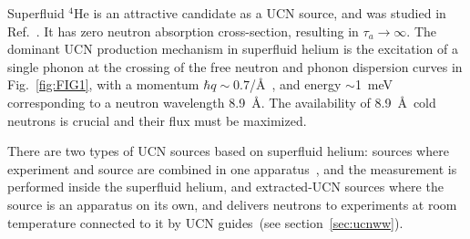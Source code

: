 Superfluid $^4$He is an attractive candidate as a UCN source, and was
studied in Ref.~\cite{Golub77}. It has zero neutron absorption
cross-section, resulting in $\tau_a \rightarrow \infty$. The dominant
UCN production mechanism in superfluid helium is the excitation of a
single phonon at the crossing of the free neutron and phonon
dispersion curves in Fig.~\ref{fig:FIG1}, with a momentum
$\hbar q\sim 0.7$/\AA~\cite{Brome2001}, and energy $\sim$1~meV
corresponding to a neutron wavelength 8.9~\AA. The availability of
8.9~\AA~cold neutrons is crucial and their flux must be maximized.


There are two types of UCN sources based on superfluid helium: sources
where experiment and source are combined in one
apparatus~\cite{van2009cryoedm, huffman2000magnetic}, and the
measurement is performed inside the superfluid helium, and
extracted-UCN sources where the source is an apparatus on its own, and
delivers neutrons to experiments at room temperature connected to it
by UCN guides~(see section~\ref{sec:ucnww}).



